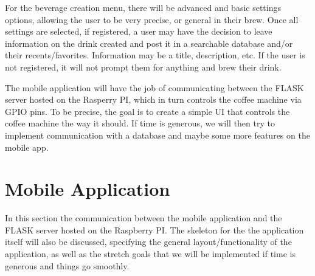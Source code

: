 \documentclass[conference]{IEEEtran}
\begin{document}
\par For the beverage creation menu, there will be advanced and basic settings options, allowing the user to be very
precise, or general in their brew. Once all settings are selected, if
registered, a user may have the decision to leave information on the drink
created and post it in a searchable database and/or their recents/favorites.
Information may be a title, description, etc. If the user is not registered, it
will not prompt them for anything and brew their drink. 

\par The mobile application
will have the job of communicating between the FLASK server hosted on the 
Rasperry PI, which in turn controls the coffee machine via GPIO pins. To be
precise, the goal is to create a simple UI that controls the coffee machine the way it should.
If time is generous, we will then try to implement communication with a database and
maybe some more features on the mobile app.


\section{Mobile Application}
In this section the communication between the mobile application and the FLASK
server hosted on the Raspberry PI. The skeleton for the the application itself will
also be discussed, specifying the general layout/functionality of the application, as
well as the stretch goals that we will be implemented if time is generous and things
go smoothly.
\end{document}
